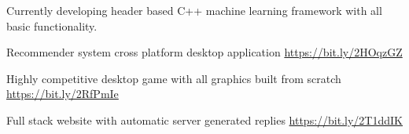     {Currently developing header based C++ machine learning framework with all basic functionality.}

    {Recommender system cross platform desktop application \url{https://bit.ly/2HOqzGZ}}

    {Highly competitive desktop game with all graphics built from scratch \url{https://bit.ly/2RfPmIe}}

    {Full stack website with automatic server generated replies \url{https://bit.ly/2T1ddIK}}
